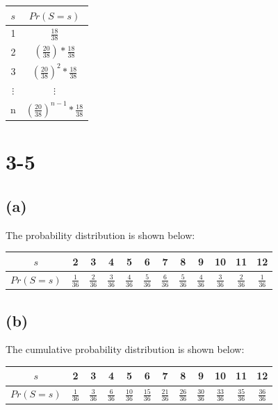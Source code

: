 \documentclass[12pt]{article}
\begin{document}
\begin{spacing}{2.0}
\begin{tabular}{|c|c|}
  \hline
  $s$ & $Pr(S=s)$ \\
  \hline
  1 & $\frac{18}{38}$ \\
  \hline
  2 & $\left(\frac{20}{38}\right)*\frac{18}{38}$ \\
  \hline
  3 & $\left(\frac{20}{38}\right)^2*\frac{18}{38}$ \\
  \hline
  $\vdots$ & $\vdots$ \\
  \hline
  n & $\left(\frac{20}{38}\right)^{n-1}*\frac{18}{38}$ \\
  \hline
\end{tabular}

\section*{3-5}

\subsection*{(a)}

The probability distribution is shown below:

\begin{tabular}{|c|c|c|c|c|c|c|c|c|c|c|c|}
  \hline
  $s$ & 2 & 3 & 4 & 5 & 6 & 7 & 8 & 9 & 10 & 11 & 12 \\
  \hline
  $Pr(S=s)$ & $\frac{1}{36}$ & $\frac{2}{36}$ & $\frac{3}{36}$ & $\frac{4}{36}$ & $\frac{5}{36}$ & $\frac{6}{36}$ & $\frac{5}{36}$ & $\frac{4}{36}$ & $\frac{3}{36}$ & $\frac{2}{36}$ & $\frac{1}{36}$ \\
  \hline
\end{tabular}

\subsection*{(b)}

The cumulative probability distribution is shown below:

\begin{tabular}{|c|c|c|c|c|c|c|c|c|c|c|c|}
  \hline
  $s$ & 2 & 3 & 4 & 5 & 6 & 7 & 8 & 9 & 10 & 11 & 12 \\
  \hline
  $Pr(S=s)$ & $\frac{1}{36}$ & $\frac{3}{36}$ & $\frac{6}{36}$ & $\frac{10}{36}$ & $\frac{15}{36}$ & $\frac{21}{36}$ & $\frac{26}{36}$ & $\frac{30}{36}$ & $\frac{33}{36}$ & $\frac{35}{36}$ & $\frac{36}{36}$ \\
  \hline
\end{tabular}


\end{spacing}
\end{document}

